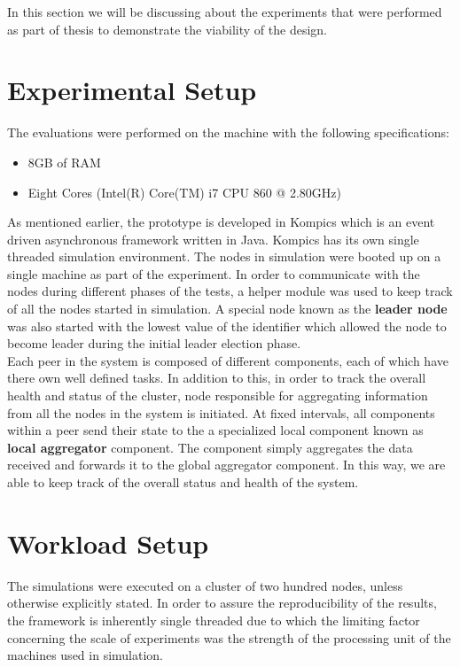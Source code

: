 \documentclass[12pt,a4paper,twoside,openright]{book}
\begin{document}
In this section we will be discussing about the experiments that were performed as part of thesis to demonstrate the viability of the design.

\section{Experimental Setup}

The evaluations were performed on the machine with the following specifications:

\begin{itemize}
\item 8GB of RAM
\item Eight Cores (Intel(R) Core(TM) i7 CPU 860  @ 2.80GHz)
\end{itemize}

As mentioned earlier, the prototype is developed in Kompics which is an event driven asynchronous framework written in Java. Kompics has its own single threaded simulation environment. The nodes in simulation were booted up on a single machine as part of the experiment. In order to communicate with the nodes during different phases of the tests, a helper module was used to keep track of all the nodes started in simulation. A special node known as the \textbf{leader node} was also started with the lowest value of the identifier which allowed the node to become leader during the initial leader election phase. \\

Each peer in the system is composed of different components, each of which have there own well defined tasks. In addition to this, in order to track the overall health and status of the cluster, node responsible for aggregating information from all the nodes in the system is initiated. At fixed intervals, all components within a peer send their state to the a specialized local component known as \textbf{local aggregator} component. The component simply aggregates the data received and forwards it to the global aggregator component. In this way,  we are able to keep track of the overall status and health of the system.


\section{Workload Setup}

The simulations were executed on a cluster of two hundred nodes, unless otherwise explicitly stated. In order to assure the reproducibility of the results, the framework is inherently single threaded due to which the limiting factor concerning the scale of experiments was the strength of the processing unit of the machines used in simulation. \\
\end{document}
